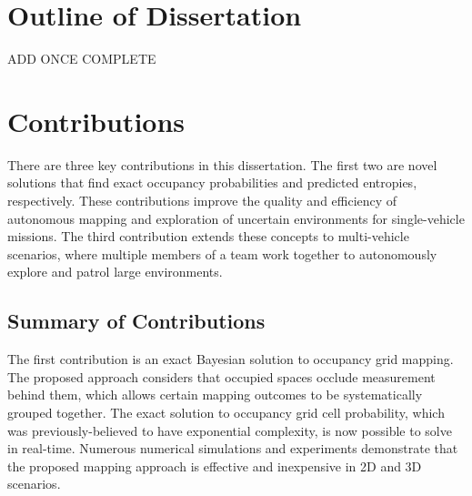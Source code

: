 \documentclass[thesis]{thesis-gwu}
\begin{document}
\section{Outline of Dissertation}

ADD ONCE COMPLETE

\section{Contributions}

There are three key contributions in this dissertation. The first two are novel solutions that find exact occupancy probabilities and predicted entropies, respectively. These contributions improve the quality and efficiency of autonomous mapping and exploration of uncertain environments for single-vehicle missions. The third contribution extends these concepts to multi-vehicle scenarios, where multiple members of a team work together to autonomously explore and patrol large environments.


\subsection{Summary of Contributions}

The first contribution is an exact Bayesian solution to occupancy grid mapping. The proposed approach considers that occupied spaces occlude measurement behind them, which allows certain mapping outcomes to be systematically grouped together. The exact solution to occupancy grid cell probability, which was previously-believed to have exponential complexity, is now possible to solve in real-time. Numerous numerical simulations and experiments demonstrate that the proposed mapping approach is effective and inexpensive in 2D and 3D scenarios.

\end{document}
